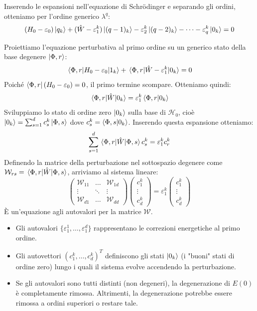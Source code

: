 Inserendo le espansioni nell'equazione di Schrödinger e separando gli ordini, otteniamo per l'ordine generico $\lambda^q$:
\[
    (H_0 - \varepsilon_0)\ket{q_k} + (\hat{W} - \varepsilon_1^k)\ket{(q-1)_k} - \varepsilon_2^k\ket{(q-2)_k} - \dots - \varepsilon_q^k \ket{0_k} = 0
\]

Proiettiamo l'equazione perturbativa al primo ordine su un generico stato della base degenere $\ket{\Phi, r}$:
\[
    \mel{\Phi,r}{H_0 - \varepsilon_0}{1_k} + \mel{\Phi,r}{\hat{W} - \varepsilon_1^k}{0_k} = 0
\]
Poiché $\bra{\Phi,r}(H_0 - \varepsilon_0) = 0$, il primo termine scompare. Otteniamo quindi:
\[
    \mel{\Phi,r}{\hat{W}}{0_k} = \varepsilon_1^k \braket{\Phi,r}{0_k}
\]
Sviluppiamo lo stato di ordine zero $\ket{0_k}$ sulla base di $\mathcal{H}_0$, cioè $\ket{0_k} = \sum_{s=1}^d c_s^k \ket{\Phi,s}$ dove $c_s^k = \braket{\Phi,s}{0_k}$. Inserendo questa espansione otteniamo:
\[
    \sum_{s=1}^d \mel{\Phi,r}{\hat{W}}{\Phi,s} c_s^k = \varepsilon_1^k c_r^k
\]
Definendo la matrice della perturbazione nel sottospazio degenere come $\mathcal{W}_{rs} = \mel{\Phi,r}{\hat{W}}{\Phi,s}$, arriviamo al sistema lineare:
\[
    \begin{pmatrix}
        \mathcal{W}_{11} & \dots & \mathcal{W}_{1d} \\
        \vdots & \ddots & \vdots \\
        \mathcal{W}_{d1} & \dots & \mathcal{W}_{dd}
    \end{pmatrix}
    \begin{pmatrix}
        c_1^k \\ \vdots \\ c_d^k
    \end{pmatrix}
    = \varepsilon_1^k
    \begin{pmatrix}
        c_1^k \\ \vdots \\ c_d^k
    \end{pmatrix}
\]
È un'equazione agli autovalori per la matrice $\mathcal{W}$.

\begin{itemize}
    \item Gli autovalori $\{\varepsilon_1^1, \dots, \varepsilon_1^d\}$ rappresentano le correzioni energetiche al primo ordine.
    \item Gli autovettori $(c_1^k, \dots, c_d^k)^T$ definiscono gli stati $\ket{0_k}$ (i "buoni" stati di ordine zero) lungo i quali il sistema evolve accendendo la perturbazione.
    \item Se gli autovalori sono tutti distinti (non degeneri), la degenerazione di $E(0)$ è completamente rimossa. Altrimenti, la degenerazione potrebbe essere rimossa a ordini superiori o restare tale.
\end{itemize}


